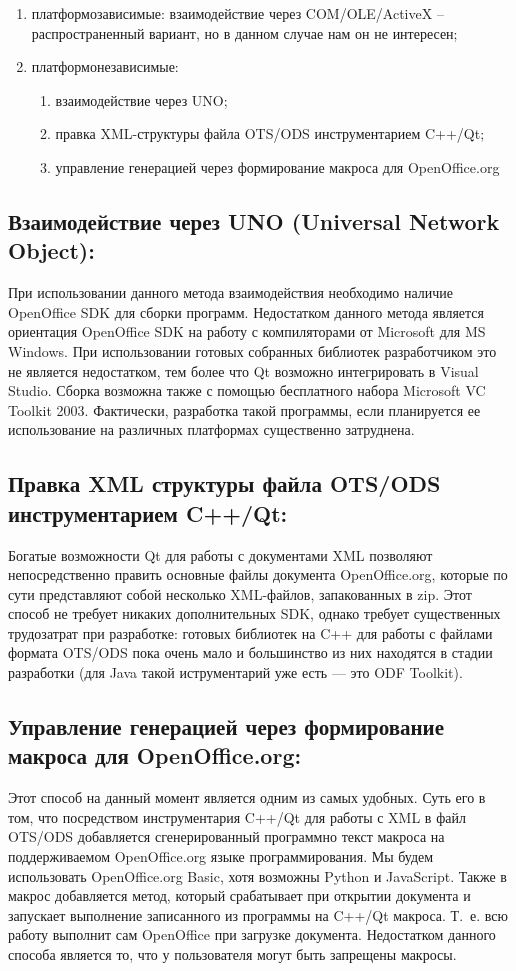 \documentclass[10pt, a5paper]{article}
\begin{document}
\begin{enumerate}
\item платформозависимые: взаимодействие через COM/OLE/ActiveX – распространенный вариант, но в данном случае нам он не интересен;
\item платформонезависимые:
\begin{enumerate} 
\item взаимодействие через UNO;
\item правка XML-структуры файла OTS/ODS инструментарием C++/Qt;
\item управление генерацией через формирование макроса для OpenOffice.org
\end{enumerate}
\end{enumerate}

\subsection*{Взаимодействие через UNO (Universal Network Object):}
При использовании данного метода взаимодействия необходимо наличие OpenOffice SDK для сборки программ. Недостатком данного метода является ориентация OpenOffice SDK на работу с компиляторами от Microsoft для MS Windows. При использовании готовых собранных библиотек разработчиком это не является недостатком, тем более что Qt возможно интегрировать в Visual Studio. Сборка возможна также с помощью бесплатного набора Microsoft VC Toolkit 2003. Фактически, разработка такой программы, если планируется ее использование на различных платформах существенно затруднена.

\subsection*{Правка XML структуры файла OTS/ODS инструментарием C++/Qt:}
Богатые возможности Qt для работы с документами XML позволяют непосредственно править основные файлы документа OpenOffice.org, которые по сути представляют собой несколько XML-файлов, запакованных в zip. Этот способ не требует никаких дополнительных SDK, однако требует существенных трудозатрат при разработке: готовых библиотек на C++ для работы с файлами формата OTS/ODS пока очень мало и большинство из них находятся в стадии разработки (для Java такой иструментарий уже есть — это ODF Toolkit).

\subsection*{Управление генерацией через формирование макроса для OpenOffice.org:}
Этот способ на данный момент является одним из самых удобных. Суть его в том, что посредством инструментария C++/Qt для работы с XML в файл  OTS/ODS добавляется сгенерированный программно текст макроса на поддерживаемом OpenOffice.org языке программирования. Мы будем использовать OpenOffice.org Basic, хотя возможны Python и JavaScript. Также в макрос добавляется метод, который срабатывает при открытии документа и запускает выполнение записанного из программы на C++/Qt макроса. Т. е. всю работу выполнит сам OpenOffice при загрузке документа. Недостатком данного способа является то, что у пользователя могут быть запрещены макросы.
\end{document}
